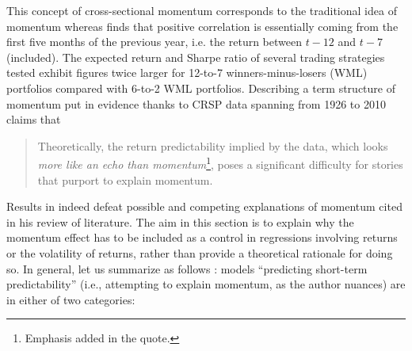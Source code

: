 This concept of cross-sectional momentum corresponds to the traditional idea of momentum whereas \cite{Novy-Marx2012} finds that positive correlation is essentially coming from the first five months of the previous year, i.e. the return between $t-12$ and $t-7$ (included). The expected return and Sharpe ratio of several trading strategies tested exhibit figures twice larger for 12-to-7 winners-minus-losers (WML) portfolios compared with 6-to-2 WML portfolios. Describing a term structure of momentum put in evidence thanks to CRSP data spanning from 1926 to 2010 \cite{Novy-Marx2012} claims that
\begin{quotation}
Theoretically, the return predictability implied by the data, which looks \emph{more like an echo than momentum}\footnote{Emphasis added in the quote.}, poses a significant difficulty for stories that purport to explain momentum.
\end{quotation}
Results in \cite{Novy-Marx2012} indeed defeat possible and competing explanations of momentum cited in his review of literature. The aim in this section is to explain why the momentum effect has to be included as a control in regressions involving returns or the volatility of returns, rather than provide a theoretical rationale for doing so. In general, let us summarize as follows : models ``predicting short-term predictability'' (i.e., attempting to explain momentum, as the author nuances) are in either of two categories:
